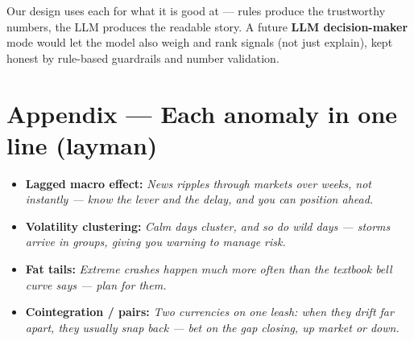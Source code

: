 \documentclass[11pt]{article}
\begin{document}
\begin{opp}
Our design uses each for what it is good at — rules produce the trustworthy numbers,
the LLM produces the readable story. A future \textbf{LLM decision-maker} mode would
let the model also weigh and rank signals (not just explain), kept honest by
rule-based guardrails and number validation.
\end{opp}

\section*{Appendix — Each anomaly in one line (layman)}
\begin{itemize}
\item \textbf{Lagged macro effect:} \textit{News ripples through markets over weeks,
not instantly — know the lever and the delay, and you can position ahead.}
\item \textbf{Volatility clustering:} \textit{Calm days cluster, and so do wild days —
storms arrive in groups, giving you warning to manage risk.}
\item \textbf{Fat tails:} \textit{Extreme crashes happen much more often than the
textbook bell curve says — plan for them.}
\item \textbf{Cointegration / pairs:} \textit{Two currencies on one leash: when they
drift far apart, they usually snap back — bet on the gap closing, up market or down.}
\end{itemize}
\end{document}
